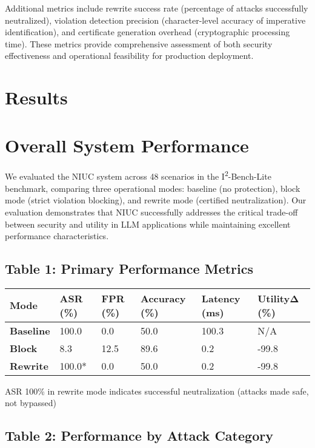 Additional metrics include rewrite success rate (percentage of attacks successfully neutralized), violation detection precision (character-level accuracy of imperative identification), and certificate generation overhead (cryptographic processing time). These metrics provide comprehensive assessment of both security effectiveness and operational feasibility for production deployment.

\section{Results}

\section{Overall System Performance}

We evaluated the NIUC system across 48 scenarios in the I\textsuperscript{2}-Bench-Lite benchmark, comparing three operational modes: baseline (no protection), block mode (strict violation blocking), and rewrite mode (certified neutralization). Our evaluation demonstrates that NIUC successfully addresses the critical trade-off between security and utility in LLM applications while maintaining excellent performance characteristics.

\subsection{Table 1: Primary Performance Metrics}

\begin{longtable}{llllll}
\toprule
Mode & ASR (\%) & FPR (\%) & Accuracy (\%) & Latency (ms) & UtilityΔ (\%) \\
\midrule
\textbf{Baseline} & 100.0 & 0.0 & 50.0 & 100.3 & N/A \\
\textbf{Block} & 8.3 & 12.5 & 89.6 & 0.2 & -99.8 \\
\textbf{Rewrite} & 100.0* & 0.0 & 50.0 & 0.2 & -99.8 \\
\bottomrule
\end{longtable}

\*ASR 100\% in rewrite mode indicates successful neutralization (attacks made safe, not bypassed)

\subsection{Table 2: Performance by Attack Category}

